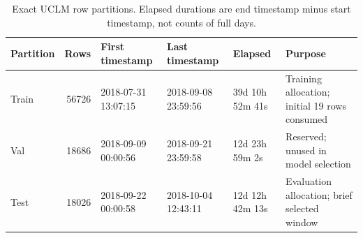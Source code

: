 \begin{table}[t]
\centering\footnotesize
\caption{Exact UCLM row partitions. Elapsed durations are end timestamp minus start timestamp, not counts of full days.}
\label{tab:split}
\begin{tabular}{@{}lrllll@{}}\toprule
Partition & Rows & First timestamp & Last timestamp & Elapsed & Purpose\\\midrule
Train & 56726 & 2018-07-31 13:07:15 & 2018-09-08 23:59:56 & 39d 10h 52m 41s & Training allocation; initial 19 rows consumed \\
Val & 18686 & 2018-09-09 00:00:56 & 2018-09-21 23:59:58 & 12d 23h 59m 2s & Reserved; unused in model selection \\
Test & 18026 & 2018-09-22 00:00:58 & 2018-10-04 12:43:11 & 12d 12h 42m 13s & Evaluation allocation; brief selected window \\
\bottomrule\end{tabular}
\end{table}
